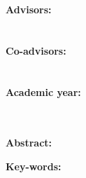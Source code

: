 \begin{center}
    \begin{minipage}[t]{.24\textwidth}
    \begin{minipage}{.90\textwidth}
    \noindent
    \scriptsize{
    \textbf{Advisors:} \\
    \advisor \\
    \\
    \textbf{Co-advisors:} \\ %
    \firstcoadvisor \\ %
    \\ %
    \textbf{Academic year:} \\
    \YEAR \\
    \\
    }
    \end{minipage}
    \end{minipage}%
        \begin{minipage}{.74\textwidth}
        \noindent \textbf{\color{bluePoli} Abstract:} {\abstract}
        \end{minipage}
    \end{center}
    
    \vspace{15pt}
    
    \begin{tcolorbox}[arc=0pt, boxrule=0pt, colback=bluePoli!60, width=\textwidth, colupper=white]
        \textbf{Key-words:} \keywords
    \end{tcolorbox}
    
            

\thispagestyle{plain} %
